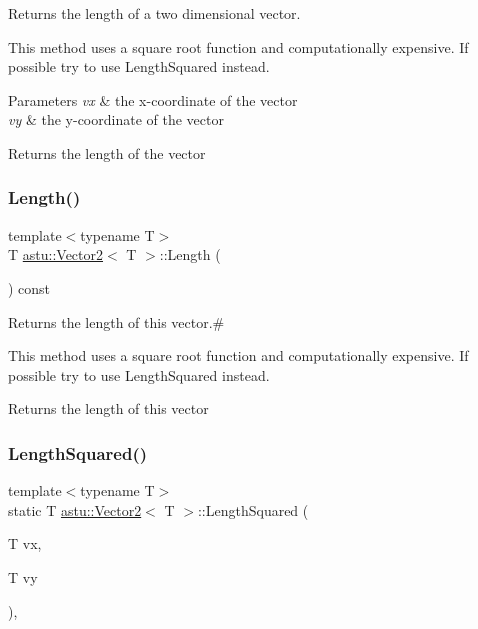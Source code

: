 Returns the length of a two dimensional vector.

This method uses a square root function and computationally expensive. If possible try to use {\ttfamily Length\+Squared} instead.


\begin{DoxyParams}{Parameters}
{\em vx} & the x-\/coordinate of the vector \\
\hline
{\em vy} & the y-\/coordinate of the vector \\
\hline
\end{DoxyParams}
\begin{DoxyReturn}{Returns}
the length of the vector 
\end{DoxyReturn}
\mbox{\label{classastu_1_1Vector2_ab195006315ba4e54f6e89e01727dbd08}} 
\subsubsection{\texorpdfstring{Length()}{Length()}\hspace{0.1cm}{\footnotesize\ttfamily [2/2]}}
{\footnotesize\ttfamily template$<$typename T$>$ \\
T \hyperlink{classastu_1_1Vector2}{astu\+::\+Vector2}$<$ T $>$\+::Length (\begin{DoxyParamCaption}{ }\end{DoxyParamCaption}) const\hspace{0.3cm}{\ttfamily [inline]}}

Returns the length of this vector.\#

This method uses a square root function and computationally expensive. If possible try to use {\ttfamily Length\+Squared} instead.

\begin{DoxyReturn}{Returns}
the length of this vector 
\end{DoxyReturn}
\mbox{\label{classastu_1_1Vector2_afbc3ba40ff99e66abbe5db6b5adb6b97}} 
\subsubsection{\texorpdfstring{Length\+Squared()}{LengthSquared()}\hspace{0.1cm}{\footnotesize\ttfamily [1/2]}}
{\footnotesize\ttfamily template$<$typename T$>$ \\
static T \hyperlink{classastu_1_1Vector2}{astu\+::\+Vector2}$<$ T $>$\+::Length\+Squared (\begin{DoxyParamCaption}\item[{T}]{vx,  }\item[{T}]{vy }\end{DoxyParamCaption})\hspace{0.3cm}{\ttfamily [inline]}, {\ttfamily [static]}}

